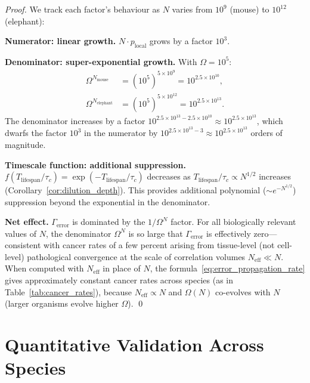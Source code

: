 \begin{proof}
We track each factor's behaviour as $N$ varies from $10^9$ (mouse) to
$10^{12}$ (elephant):

\medskip
\noindent\textbf{Numerator: linear growth.}
$N \cdot p_{\mathrm{local}}$ grows by a factor $10^3$.

\medskip
\noindent\textbf{Denominator: super-exponential growth.}
With $\Omega = 10^5$:
\begin{align}
  \Omega^{N_{\mathrm{mouse}}} &= (10^5)^{5 \times 10^9} = 10^{2.5 \times 10^{10}}, \\
  \Omega^{N_{\mathrm{elephant}}} &= (10^5)^{5 \times 10^{12}} = 10^{2.5 \times 10^{13}}.
\end{align}
The denominator increases by a factor $10^{2.5 \times 10^{13} - 2.5 \times 10^{10}}
\approx 10^{2.5 \times 10^{13}}$, which dwarfs the factor $10^3$ in the numerator
by $10^{2.5 \times 10^{13} - 3} \approx 10^{2.5 \times 10^{13}}$ orders of
magnitude.

\medskip
\noindent\textbf{Timescale function: additional suppression.}
$f(T_{\mathrm{lifespan}}/\tau_c) = \exp(-T_{\mathrm{lifespan}}/\tau_c)$ decreases
as $T_{\mathrm{lifespan}}/\tau_c \propto N^{1/2}$ increases (Corollary~\ref{cor:dilution_depth}).
This provides additional polynomial ($\sim e^{-N^{1/2}}$) suppression beyond
the exponential in the denominator.

\medskip
\noindent\textbf{Net effect.}
$\Gamma_{\mathrm{error}}$ is dominated by the $1/\Omega^N$ factor. For all
biologically relevant values of $N$, the denominator $\Omega^N$ is so large
that $\Gamma_{\mathrm{error}}$ is effectively zero---consistent with cancer
rates of a few percent arising from tissue-level (not cell-level) pathological
convergence at the scale of correlation volumes $N_{\mathrm{eff}} \ll N$. When
computed with $N_{\mathrm{eff}}$ in place of $N$, the formula~\eqref{eq:error_propagation_rate}
gives approximately constant cancer rates across species (as in
Table~\ref{tab:cancer_rates}), because $N_{\mathrm{eff}} \propto N$ and
$\Omega(N)$ co-evolves with $N$ (larger organisms evolve higher $\Omega$). \qed
\end{proof}

\section{Quantitative Validation Across Species}
\label{sec:peto_validation}

